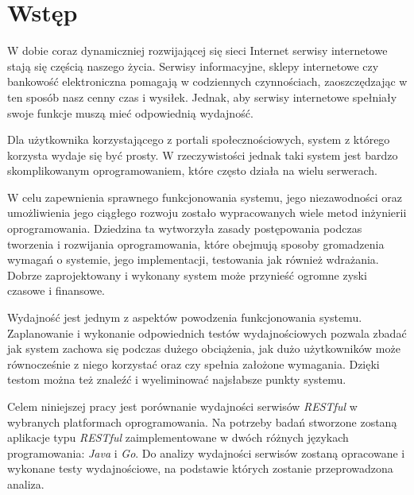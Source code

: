 \chapter{Wstęp}

W dobie coraz dynamiczniej rozwijającej się sieci Internet serwisy internetowe stają się częścią  naszego życia. Serwisy informacyjne, sklepy internetowe czy bankowość elektroniczna pomagają w codziennych czynnościach,  zaoszczędzając w ten sposób nasz cenny czas i wysiłek. Jednak, aby  serwisy internetowe spełniały swoje funkcje muszą  mieć odpowiednią wydajność. 

Dla użytkownika korzystającego z portali społecznościowych, system z którego korzysta wydaje się być prosty. W rzeczywistości jednak taki system jest bardzo skomplikowanym oprogramowaniem, które często działa na wielu serwerach.

W celu zapewnienia sprawnego funkcjonowania  systemu, jego niezawodności oraz umożliwienia jego ciągłego rozwoju zostało wypracowanych wiele metod inżynierii oprogramowania. Dziedzina ta wytworzyła zasady postępowania podczas tworzenia i rozwijania oprogramowania, które obejmują sposoby gromadzenia wymagań o systemie, jego implementacji, testowania jak również wdrażania. Dobrze zaprojektowany i wykonany system może przynieść ogromne zyski czasowe i finansowe. 

Wydajność jest jednym z aspektów powodzenia funkcjonowania systemu. Zaplanowanie i wykonanie odpowiednich testów wydajnościowych pozwala zbadać jak system zachowa się podczas dużego obciążenia, jak dużo użytkowników może równocześnie z niego korzystać oraz czy spełnia założone wymagania. Dzięki testom można też znaleźć i wyeliminować najsłabsze punkty systemu.

Celem niniejszej pracy jest  porównanie wydajności serwisów  \textsl{RESTful} w wybranych platformach oprogramowania. Na potrzeby badań  stworzone zostaną aplikacje typu \textsl{RESTful} zaimplementowane  w dwóch różnych językach programowania: \textsl{Java} i \textsl{Go}.  Do analizy wydajności serwisów zostaną opracowane i wykonane testy wydajnościowe, na podstawie których zostanie przeprowadzona analiza.
